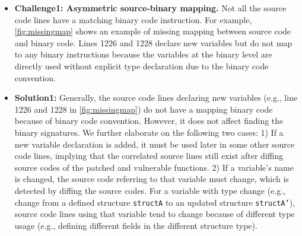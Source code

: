 \begin{itemize}
    \item \textbf{Challenge1: Asymmetric source-binary mapping.} 
    Not all the source code lines have a matching binary code instruction. 
    For example, \autoref{fig:missingmap} shows an example of missing mapping between source code and binary code. 
    Lines 1226 and 1228 declare new variables but do not map to any binary instructions because the variables at the binary level are directly used without explicit type declaration due to the binary code convention. 
    
    \item \textbf{Solution1:} 
    Generally, the source code lines declaring new variables (e.g., line 1226 and 1228 in \autoref{fig:missingmap}) do not have a mapping binary code because of binary code convention.  %
    However, it does not affect finding the binary signatures. 
    We further elaborate on the following two cases: 
    1) If a new variable declaration is added, it must be used later in some other source code lines, implying that the correlated source lines still exist after diffing source codes of the patched and vulnerable functions. 
    2) If a variable's name is changed, the source code referring to that variable must change, which is detected by diffing the source codes. 
    For a variable with type change (e.g., change from a defined structure \texttt{structA} to an updated structure \texttt{structA'}), source code lines using that variable tend to change because of different type usage (e.g., defining different fields in the different structure type). 
\end{itemize}


